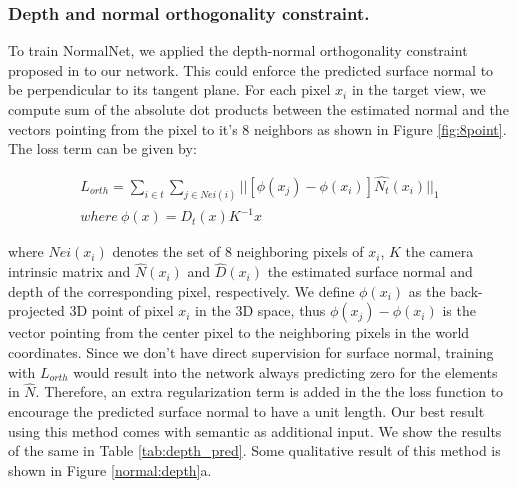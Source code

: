 \documentclass[10pt,twocolumn,letterpaper]{article}
\begin{document}
\subsubsection{Depth and normal orthogonality constraint.}
To train NormalNet, we applied the depth-normal orthogonality constraint proposed in \cite{yang2017unsupervised} to our network. This could enforce the predicted surface normal to be perpendicular to its tangent plane. For each pixel $x_i$ in the target view, we compute sum of the absolute dot products between the estimated normal and the vectors pointing from the pixel to it's 8 neighbors as shown in Figure \ref{fig:8point}. The loss term can be given by:

\begin{multline}
     L_{orth} = \sum_{i\in t}\sum_{j\in Nei(i)}||[ \phi(x_j) - \phi(x_i)] \hat{N_t}(x_i)||_1 \\ 
    where\ \phi(x) = D_t(x)K^{-1}x 
\end{multline}

\noindent where $Nei(x_i)$ denotes the set of 8 neighboring pixels of $x_i$, $K$ the camera intrinsic matrix and $\hat N(x_i)$ and $\hat D(x_i)$ the estimated surface normal and depth of the corresponding pixel, respectively. We define $\phi(x_i)$ as the back-projected 3D point of pixel $x_i$ in the 3D space, thus $\phi(x_j) - \phi(x_i)$ is the vector pointing from the center pixel to the neighboring pixels in the world coordinates. Since we don't have direct supervision for surface normal, training with $L_{orth}$ would result into the network always predicting zero for the elements in $\hat{N}$. Therefore, an extra regularization term is added in the the loss function to encourage the predicted surface normal to have a unit length. Our best result using this method comes with semantic as additional input. We show the results of the same in Table \ref{tab:depth_pred}. Some qualitative result of this method is shown in Figure \ref{normal:depth}a.
\end{document}

